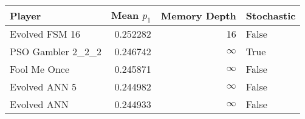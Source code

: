 \begin{tabular}{lrrl}
\toprule
            Player &  Mean $p_1$ &  Memory Depth & Stochastic \\
\midrule
    Evolved FSM 16 &    0.252282 &            16 &      False \\
 PSO Gambler 2\_2\_2 &    0.246742 &            \(\infty\) &       True \\
      Fool Me Once &    0.245871 &            \(\infty\) &      False \\
     Evolved ANN 5 &    0.244982 &            \(\infty\) &      False \\
       Evolved ANN &    0.244933 &            \(\infty\) &      False \\
\bottomrule
\end{tabular}
